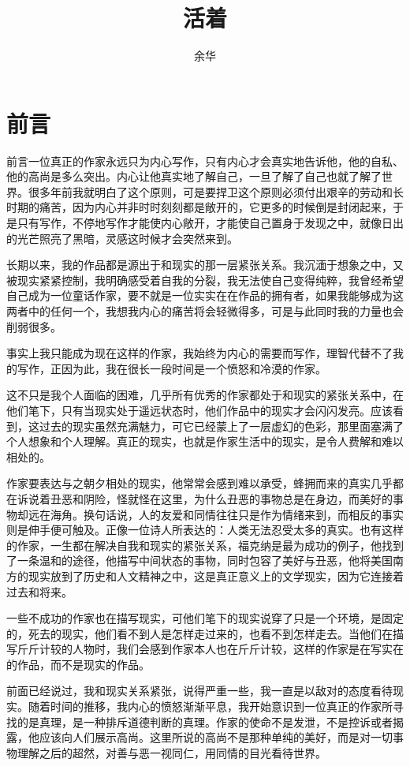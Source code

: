 \documentclass[12pt,UTF8]{ctexbook}
\title{\heiti\zihao{0} 活着}
\author{余华}
\date{}
\begin{document}
\maketitle
\tableofcontents

\frontmatter
\chapter{前言}

前言一位真正的作家永远只为内心写作，只有内心才会真实地告诉他，他的自私、他的高尚是多么突出。内心让他真实地了解自己，一旦了解了自己也就了解了世界。很多年前我就明白了这个原则，可是要捍卫这个原则必须付出艰辛的劳动和长时期的痛苦，因为内心并非时时刻刻都是敞开的，它更多的时候倒是封闭起来，于是只有写作，不停地写作才能使内心敞开，才能使自己置身于发现之中，就像日出的光芒照亮了黑暗，灵感这时候才会突然来到。

长期以来，我的作品都是源出于和现实的那一层紧张关系。我沉湎于想象之中，又被现实紧紧控制，我明确感受着自我的分裂，我无法使自己变得纯粹，我曾经希望自己成为一位童话作家，要不就是一位实实在在作品的拥有者，如果我能够成为这两者中的任何一个，我想我内心的痛苦将会轻微得多，可是与此同时我的力量也会削弱很多。

事实上我只能成为现在这样的作家，我始终为内心的需要而写作，理智代替不了我的写作，正因为此，我在很长一段时间是一个愤怒和冷漠的作家。

这不只是我个人面临的困难，几乎所有优秀的作家都处于和现实的紧张关系中，在他们笔下，只有当现实处于遥远状态时，他们作品中的现实才会闪闪发亮。应该看到，这过去的现实虽然充满魅力，可它已经蒙上了一层虚幻的色彩，那里面塞满了个人想象和个人理解。真正的现实，也就是作家生活中的现实，是令人费解和难以相处的。

作家要表达与之朝夕相处的现实，他常常会感到难以承受，蜂拥而来的真实几乎都在诉说着丑恶和阴险，怪就怪在这里，为什么丑恶的事物总是在身边，而美好的事物却远在海角。换句话说，人的友爱和同情往往只是作为情绪来到，而相反的事实则是伸手便可触及。正像一位诗人所表达的：人类无法忍受太多的真实。也有这样的作家，一生都在解决自我和现实的紧张关系，福克纳是最为成功的例子，他找到了一条温和的途径，他描写中间状态的事物，同时包容了美好与丑恶，他将美国南方的现实放到了历史和人文精神之中，这是真正意义上的文学现实，因为它连接着过去和将来。

一些不成功的作家也在描写现实，可他们笔下的现实说穿了只是一个环境，是固定的，死去的现实，他们看不到人是怎样走过来的，也看不到怎样走去。当他们在描写斤斤计较的人物时，我们会感到作家本人也在斤斤计较，这样的作家是在写实在的作品，而不是现实的作品。

前面已经说过，我和现实关系紧张，说得严重一些，我一直是以敌对的态度看待现实。随着时间的推移，我内心的愤怒渐渐平息，我开始意识到一位真正的作家所寻找的是真理，是一种排斥道德判断的真理。作家的使命不是发泄，不是控诉或者揭露，他应该向人们展示高尚。这里所说的高尚不是那种单纯的美好，而是对一切事物理解之后的超然，对善与恶一视同仁，用同情的目光看待世界。
\end{document}
